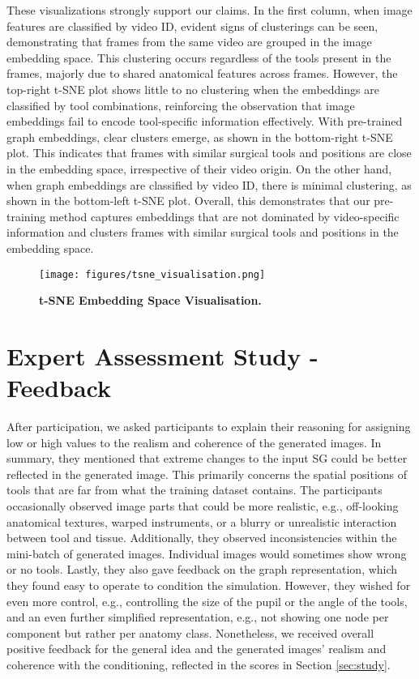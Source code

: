 These visualizations strongly support our claims. In the first column, when image features are classified by video ID, evident signs of clusterings can be seen, demonstrating that frames from the same video are grouped in the image embedding space. This clustering occurs regardless of the tools present in the frames, majorly due to shared anatomical features across frames. However, the top-right t-SNE plot shows little to no clustering when the embeddings are classified by tool combinations, reinforcing the observation that image embeddings fail to encode tool-specific information effectively. With pre-trained graph embeddings, clear clusters emerge, as shown in the bottom-right t-SNE plot. This indicates that frames with similar surgical tools and positions are close in the embedding space, irrespective of their video origin. On the other hand, when graph embeddings are classified by video ID, there is minimal clustering, as shown in the bottom-left t-SNE plot. Overall, this demonstrates that our pre-training method captures embeddings that are not dominated by video-specific information and clusters frames with similar surgical tools and positions in the embedding space.

\begin{figure}[htbp]
    \centering
    \texttt{[image: figures/tsne\_visualisation.png]}
    \caption{\textbf{t-SNE Embedding Space Visualisation.} }
    \label{fig:tsne_visualisation}
\end{figure}

\section{Expert Assessment Study - Feedback}
\label{sec:app_fb}
After participation, we asked participants to explain their reasoning for assigning low or high values to the realism and coherence of the generated images.
In summary, they mentioned that extreme changes to the input SG could be better reflected in the generated image. This primarily concerns the spatial positions of tools that are far from what the training dataset contains. The participants occasionally observed image parts that could be more realistic, e.g., off-looking anatomical textures, warped instruments, or a blurry or unrealistic interaction between tool and tissue. 
Additionally, they observed inconsistencies within the mini-batch of generated images. Individual images would sometimes show wrong or no tools.
Lastly, they also gave feedback on the graph representation, which they found easy to operate to condition the simulation. However, they wished for even more control, e.g., controlling the size of the pupil or the angle of the tools, and an even further simplified representation, e.g., not showing one node per component but rather per anatomy class.
Nonetheless, we received overall positive feedback for the general idea and the generated images' realism and coherence with the conditioning, reflected in the scores in Section \ref{sec:study}.

